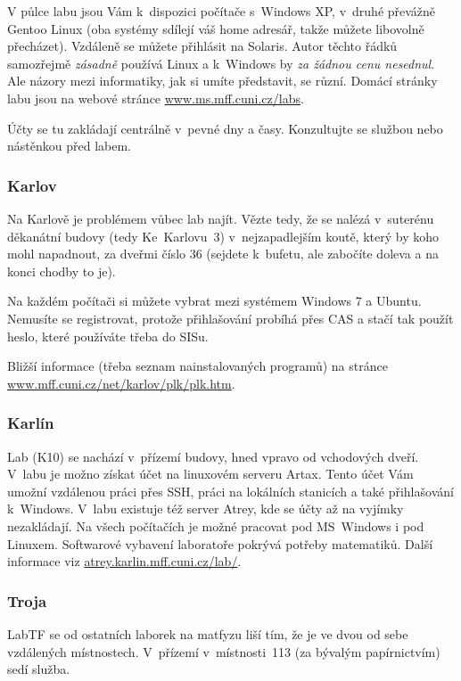 V půlce labu jsou Vám k~dispozici počítače s~Windows XP, v~druhé převážně Gentoo Linux (oba systémy sdílejí váš home
adresář, takže můžete li\-bo\-vol\-ně pře\-chá\-zet). Vzdá\-le\-ně se můžete přihlásit na Solaris. Autor těchto řádků
samozřejmě {\it zásadně} používá Linux a k~Windows by {\it za žádnou cenu nesednul}. Ale názory mezi informatiky, jak si
umíte představit, se různí. Domácí stránky labu jsou na webové stránce \url{www.ms.mff.cuni.cz/labs}.

Účty se tu zakládají centrálně v~pevné dny a časy. Konzultujte se
službou nebo nástěnkou před labem.

\subsubsection{Karlov}

Na Karlově je problémem vůbec lab najít. Vězte tedy, že se nalézá
v~suterénu děkanátní budovy (tedy Ke~Karlovu~3) v~nejzapadlejším koutě,
který by koho mohl napadnout, za dveřmi číslo 36 (sejdete
k~bufetu, ale zabočíte doleva a na konci chodby to je).

Na každém počítači si můžete vybrat mezi systémem Windows 7 a Ubuntu. Nemusíte se registrovat, protože přihlašování
probíhá přes CAS a stačí tak použít heslo, které používáte třeba do SISu.

Bližší informace (třeba seznam nainstalovaných programů) na stránce \url{www.mff.cuni.cz/net/karlov/plk/plk.htm}.

\subsubsection{Karlín}

Lab (K10) se nachází v~přízemí budovy, hned vpravo od vchodových
dveří. V~labu je možno získat účet na linuxovém serveru Artax.
Tento účet Vám umožní vzdálenou práci přes SSH, práci na lokálních
stanicích a také přihlašování k~Windows. V~labu existuje též
server Atrey, kde se účty až na vyjímky nezakládají. Na všech
počítačích je možné pracovat pod MS~Windows i pod Linuxem.
Softwarové vybavení laboratoře pokrývá potřeby matematiků. Další
informace viz \url{atrey.karlin.mff.cuni.cz/lab/}.

\subsubsection{Troja}

LabTF se od ostatních laborek na matfyzu liší tím, že je ve dvou od
sebe vzdálených místnostech. V~přízemí v~místnosti~113 (za
bývalým papírnictvím) sedí služba.

